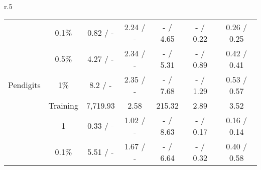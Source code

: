\begin{wraptable}[23]{r}{.5\textwidth}
{\begin{tabular}{ccccccc}
                                                     & 0.1\%                           & 0.82 / -                                                            & 2.24 / -                                                         & - / 4.65                                                              & - / 0.22                                                              & 0.26 / 0.25                        \\
                                                     & 0.5\%                           & 4.27 / -                                                            & 2.34 / -                                                         & - / 5.31                                                              & - / 0.89                                                              & 0.42 / 0.41                        \\
\multirow{-5}{*}{Pendigits}                          & 1\%                             & 8.2 / -                                                             & 2.35 / -                                                         & - / 7.68                                                              & - / 1.29                                                              & 0.53 / 0.57                        \\\midrule
                                                     & Training                        & 7,719.93                                                            & 2.58                                                             & 215.32                                                                & 2.89                                                                  & 3.52                               \\
                                                     & 1                               & 0.33 / -                                                            & 1.02 / -                                                         & - / 8.63                                                              & - / 0.17                                                              & 0.16 / 0.14                        \\
                                                     & 0.1\%                           & 5.51 / -                                                            & 1.67 / -                                                         & - / 6.64                                                              & - / 0.32                                                              & 0.40 / 0.58                        \\

\end{tabular}}
\end{wraptable}
